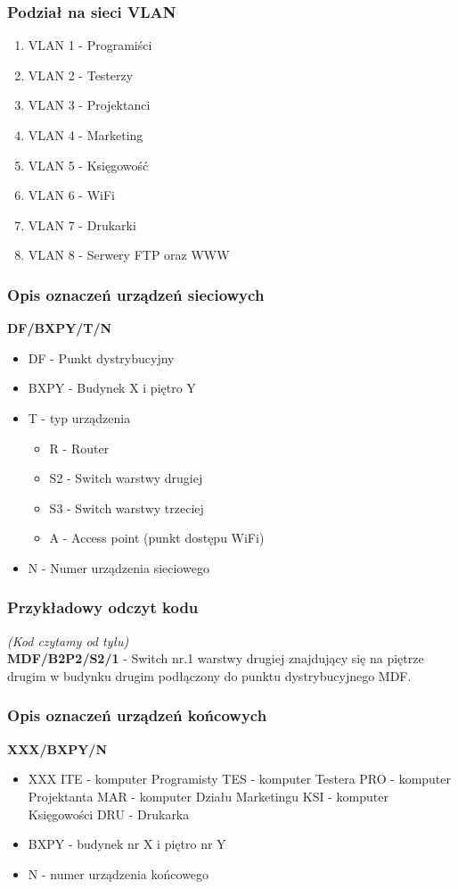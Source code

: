 \documentclass[a4paper,12pt]{extarticle}  %
\begin{document}
\subsubsection{Podział na sieci VLAN}
\begin{enumerate}
	\item VLAN 1 - Programiści
	\item VLAN 2 - Testerzy
	\item VLAN 3 - Projektanci
	\item VLAN 4 - Marketing
	\item VLAN 5 - Księgowość
	\item VLAN 6 - WiFi
	\item VLAN 7 - Drukarki
	\item VLAN 8 - Serwery FTP oraz WWW
\end{enumerate}
\subsubsection{Opis oznaczeń urządzeń sieciowych}
\textbf{DF/BXPY/T/N}
\begin{itemize}
	\item DF - Punkt dystrybucyjny
	\item BXPY - Budynek X i piętro Y
	\item T - typ urządzenia
	\begin{itemize}
		\item R - Router
		\item S2 - Switch warstwy drugiej
		\item S3 - Switch warstwy trzeciej
		\item A - Access point (punkt dostępu WiFi)
	\end{itemize}
	\item N - Numer urządzenia sieciowego
\end{itemize}
\subsubsection{Przykładowy odczyt kodu}
\emph{(Kod czytamy od tyłu)}\\
\textbf{MDF/B2P2/S2/1} - Switch nr.1 warstwy drugiej znajdujący się na piętrze drugim w budynku drugim podłączony do punktu dystrybucyjnego MDF.
\subsubsection{Opis oznaczeń urządzeń końcowych}
\textbf{XXX/BXPY/N}
\begin{itemize}
    \item XXX
        \subitem ITE - komputer Programisty
        \subitem TES - komputer Testera
        \subitem PRO - komputer Projektanta
        \subitem MAR - komputer Działu Marketingu
        \subitem KSI - komputer Księgowości
        \subitem DRU - Drukarka
    \item BXPY - budynek nr X i piętro nr Y
    \item N - numer urządzenia końcowego
\end{itemize}
\end{document}
